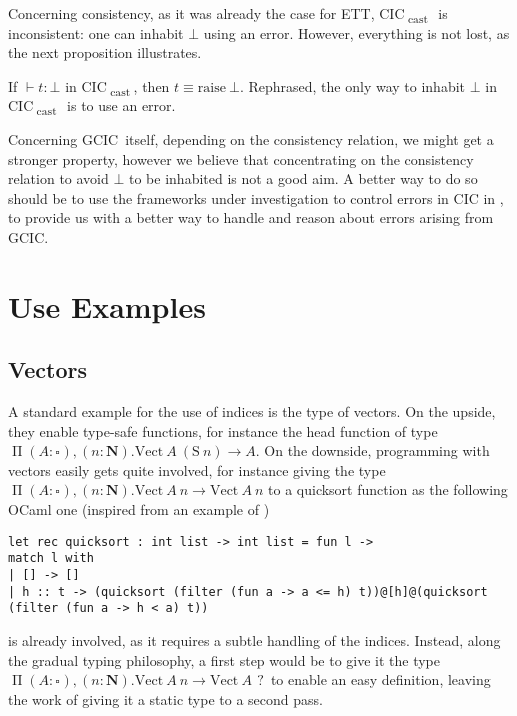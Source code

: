 \documentclass[en]{myarticle}
\renewcommand{\mathtt}{\mathrm}
\newcommand{\uni}[1][]{\square_{#1}}
\newcommand{\conv}{\equiv}
\renewcommand{\P}{\operatorname{\Pi}}
\DeclareMathOperator{\?}{?}
\newcommand{\nat}{\mathbf{N}}
\newcommand{\s}{\mathtt{S}}
\newcommand{\ve}{\mathtt{Vect}}
\newcommand{\cas}{\operatorname{\mathtt{cast}}}
\newcommand{\rai}{\mathtt{raise}}
\newcommand{\gcic}{GCIC}
\newcommand{\cacic}{CIC\textsubscript{$\cas$}}
\newcommand{\ett}{ETT}
\begin{document}
{Concerning consistency, as it was already the case for \ett, \cacic\ is inconsistent: one can inhabit $\bot$ using an error. However, everything is not lost, as the next proposition illustrates.
\begin{prop}
	If $\vdash t : \bot$ in \cacic, then $t \conv \rai~\bot$. Rephrased, the only way to inhabit $\bot$ in \cacic\ is to use an error.
\end{prop}
Concerning \gcic\ itself, depending on the consistency relation, we might get a stronger property, however we believe that concentrating on the consistency relation to avoid $\bot$ to be inhabited is not a good aim. A better way to do so should be to use the frameworks under investigation to control errors in CIC in \cite{Pedrot2018, Pedrot2019}, to provide us with a better way to handle and reason about errors arising from \gcic.

\section{Use Examples}
\label{exs}


\subsection{Vectors}
\label{veexs}

A standard example for the use of indices is the type of vectors. On the upside, they enable type-safe functions, for instance the head function of type $\P (A : \uni), (n : \nat). \ve~A~(\s~n) \to A$. On the downside, programming with vectors easily gets quite involved, for instance giving the type $\P (A : \uni), (n : \nat). \ve~A~n \to \ve~A~n$ to a quicksort function as the following OCaml one (inspired from an example of \cite{Eremondi2019})
\begin{lstlisting}[language=caml]
let rec quicksort : int list -> int list = fun l ->
match l with
| [] -> []
| h :: t -> (quicksort (filter (fun a -> a <= h) t))@[h]@(quicksort (filter (fun a -> h < a) t))
\end{lstlisting}
is already involved, as it requires a subtle handling of the indices. Instead, along the gradual typing philosophy, a first step would be to give it the type $\P (A : \uni), (n : \nat). \ve~A~n \to \ve~A~\?$ to enable an easy definition, leaving the work of giving it a static type to a second pass.

}
\end{document}
